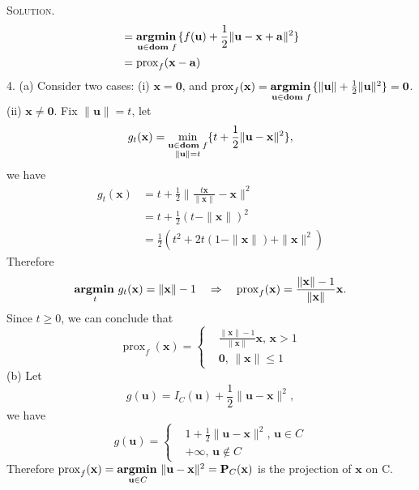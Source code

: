\documentclass[12pt, a4paper, oneside]{ctexart}
\newenvironment{solution}{\par\noindent\textsc{Solution. }}{\\\par}
\DeclareMathOperator*{\argmin}{\bf argmin\,}
\DeclareMathOperator*{\dom}{\bf dom\,}
\begin{document}
\begin{solution}
\begin{align*}
        & = \argmin_{\mathbf{u} \in \dom f} \{f(\mathbf{u}) + \frac{1}{2} \|\mathbf{u - x + a}\|^2\} \\
        & = \operatorname{prox}_f (\mathbf{x - a})
    \end{align*}
    4. (a) Consider two cases: \newline
    (i) $\mathbf{x} = \mathbf{0}$, and $\operatorname{prox}_f (\mathbf{x}) = \argmin\limits_{\mathbf{u} \in \dom f} \{ \|\mathbf{u}\| + \frac{1}{2} \|\mathbf{u}\|^2\} = \mathbf{0}$. \newline
    (ii) $\mathbf{x} \neq \mathbf{0}$. Fix $\|\mathbf{u}\| = t$, let
    \[
    g_t(\mathbf{x}) = \min_{\substack{\mathbf{u} \in \dom f \\ \|\mathbf{u}\| = t}} \{t + \frac{1}{2} \|\mathbf{u} - \mathbf{x}\|^2\},
    \]
    we have 
    \begin{align*}
	    g_t(\mathbf{x}) & = t + \frac{1}{2} \|\frac{t\mathbf{x}}{\|\mathbf{x}\|} - \mathbf{x}\|^2 \\
	    & = t + \frac{1}{2}(t - \|\mathbf{x}\|)^2 \\
	    & = \frac{1}{2}(t^2 + 2 t (1 - \|\mathbf{x}\|) + \|\mathbf{x}\|^2)
    \end{align*}
    Therefore
    \[
    \argmin\limits_{t} g_t(\mathbf{x}) = \|\mathbf{x}\| - 1 \quad \Rightarrow \quad \operatorname{prox}_f (\mathbf{x}) = \frac{\|\mathbf{x}\| - 1}{\|\mathbf{x}\|} \mathbf{x}.
    \]
    Since $t \geq 0$, we can conclude that
    \[
    \operatorname{prox}_f (\mathbf{x}) = 
    \left\lbrace
    \begin{aligned}
        & \frac{\|\mathbf{x}\| - 1}{\|\mathbf{x}\|} \mathbf{x},\, \mathbf{x} > 1 \\
        & \mathbf{0},\, \|\mathbf{x}\| \leq 1
    \end{aligned}
    \right.
    \]
    \newline
    (b) Let 
    \[
    g(\mathbf{u}) = I_C(\mathbf{u}) + \frac{1}{2} \|\mathbf{u} - \mathbf{x}\|^2, 
    \]
    we have
    \[
    g(\mathbf{u}) = 
    \left\lbrace
    \begin{aligned}
     	& 1 + \frac{1}{2} \|\mathbf{u} - \mathbf{x}\|^2,\, \mathbf{u} \in C \\
     	& +\infty,\, \mathbf{u} \notin C
    \end{aligned}
    \right.
    \]
    Therefore $\operatorname{prox}_f (\mathbf{x}) = \argmin\limits_{\mathbf{u} \in C} \|\mathbf{u} - \mathbf{x}\|^2 = \mathbf{P}_C(\mathbf{x})$ is the projection of $\mathbf{x}$ on C.
\end{solution}
\end{document}
